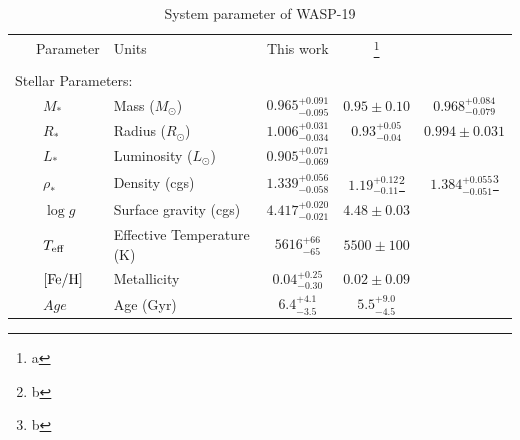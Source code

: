\begin{landscape}
\begin{longtable}{llccc}
\caption{System parameter of WASP-19}
\label{tab:wasp19}
\centering
\tabularnewline
\hline 
~~~Parameter & Units & This work & \cite{Hebb2010}\footnote{a} & \cite{Lendl2013}\\
\hline
\smallskip\\\multicolumn{2}{l}{Stellar Parameters:}&\smallskip\\
~~~~$M_*$\dotfill &Mass (\(M_\odot\))\dotfill &$0.965^{+0.091}_{-0.095}$ & $0.95\pm0.10$ & $0.968^{+0.084}_{-0.079}$ \\
~~~~$R_*$\dotfill &Radius (\(R_\odot\))\dotfill &$1.006^{+0.031}_{-0.034}$ & $0.93^{+0.05}_{-0.04}$& $0.994\pm0.031$\\
~~~~$L_*$\dotfill &Luminosity (\(L_\odot\))\dotfill &$0.905^{+0.071}_{-0.069}$\\
~~~~$\rho_*$\dotfill &Density (cgs)\dotfill &$1.339^{+0.056}_{-0.058}$ & $1.19^{+0.12}_{-0.11}$\footnote{b}  & $1.384^{+0.055}_{-0.051}$\footnote{b}\\
~~~~$\log{g}$\dotfill &Surface gravity (cgs)\dotfill &$4.417^{+0.020}_{-0.021}$ & $4.48\pm0.03$\\
~~~~$T_{\rm eff}$\dotfill &Effective Temperature (K)\dotfill &$5616^{+66}_{-65}$ & $5500\pm100$\\
~~~~$[{\rm Fe/H}]$\dotfill &Metallicity \dotfill &$0.04^{+0.25}_{-0.30}$ & $0.02\pm0.09$\\
~~~~$Age$\dotfill &Age (Gyr)\dotfill &$6.4^{+4.1}_{-3.5}$ & $5.5^{+9.0}_{-4.5}$\\


\end{longtable}
\end{landscape}
